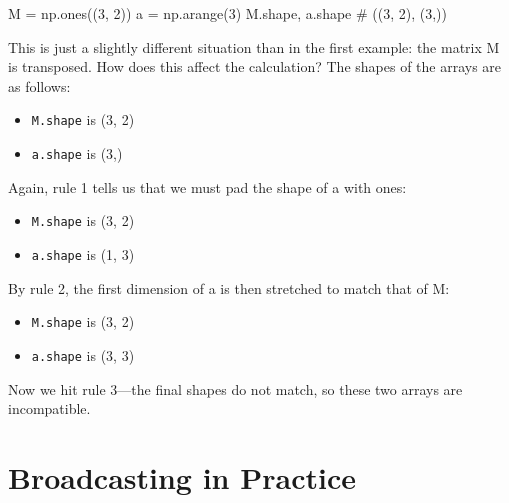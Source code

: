 \begin{pyc}
    M = np.ones((3, 2))
    a = np.arange(3)
    M.shape, a.shape
    # ((3, 2), (3,))
\end{pyc}

This is just a slightly different situation than in the first example: the matrix M is
transposed. How does this affect the calculation? The shapes of the arrays are as
follows:

\begin{itemize}
    \item \verb|M.shape| is (3, 2)
    \item \verb|a.shape| is (3,)
\end{itemize}

Again, rule 1 tells us that we must pad the shape of a with ones:

\begin{itemize}
    \item \verb|M.shape| is (3, 2)
    \item \verb|a.shape| is (1, 3)
\end{itemize}

By rule 2, the first dimension of a is then stretched to match that of M:

\begin{itemize}
    \item \verb|M.shape| is (3, 2)
    \item \verb|a.shape| is (3, 3)
\end{itemize}

Now we hit rule 3—the final shapes do not match, so these two arrays are incompatible.

\section{Broadcasting in Practice}